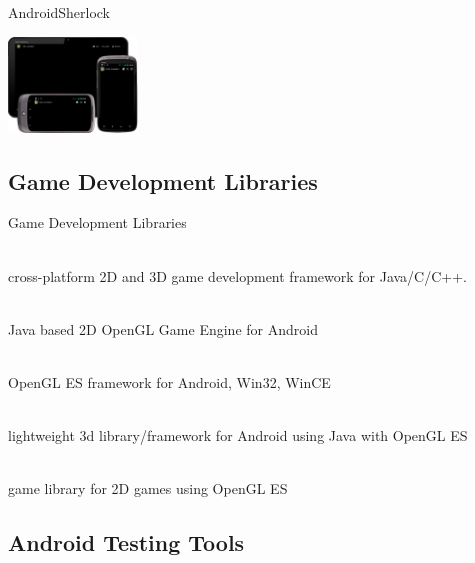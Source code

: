 \documentclass[aspectratio=169]{beamer}
\newcommand{\surl}[1] {{\tiny \url{#1}}}
\begin{document}
    \begin{frame}{AndroidSherlock}
      \begin{center}
      \includegraphics[height=1.0in]{androidsherlock.png}
      \end{center}
    \end{frame}

\subsection{Game Development Libraries}

    \begin{frame}{Game Development Libraries}
      \begin{description}
        \item<1->[libgdx \surl{http://libgdx.badlogicgames.com/}] \hfill \\ cross-platform 2D and 3D game development framework for Java/C/C++. 
        \item<2->[AndEngine \surl{http://www.andengine.org/}] \hfill \\ Java based 2D OpenGL Game Engine for Android
        \item<3->[forget3D \surl{http://code.google.com/p/forget3d/}] \hfill \\ OpenGL ES framework for Android, Win32, WinCE
        \item<4->[min3d \surl{http://code.google.com/p/min3d/}] \hfill \\ lightweight 3d library/framework for Android using Java with OpenGL ES 
        \item<5->[Angle  \surl{http://code.google.com/p/angle/}] \hfill \\ game library for 2D games using OpenGL ES
      \end{description}
    \end{frame}

  \subsection{Android Testing Tools}
\end{document}
